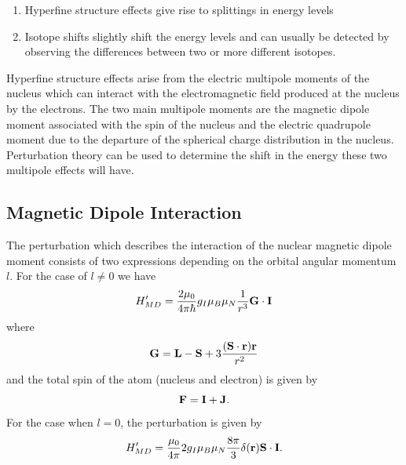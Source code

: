 \documentclass[a4paper]{IEEEtran}
\begin{document}
    \begin{enumerate}
        \item Hyperfine structure effects give rise to splittings in energy levels
        \item Isotope shifts slightly shift the energy levels and can usually be 
              detected by observing the differences between two or more 
              different isotopes.
    \end{enumerate} 

    Hyperfine structure effects arise from the electric multipole moments of the 
    nucleus which can interact with the electromagnetic field produced at the 
    nucleus by the electrons. The two main multipole moments are the magnetic 
    dipole moment associated with the spin of the nucleus and the electric quadrupole
    moment due to the departure of the spherical charge distribution in the nucleus.
    Perturbation theory can be used to determine the shift in the energy these
    two multipole effects will have.
       
    \subsection{Magnetic Dipole Interaction}
    The perturbation which describes the interaction of the nuclear magnetic dipole 
    moment consists of two expressions depending on the orbital angular momentum $l$.
    For the case of $l \neq 0$ we have
    \begin{equation}
        H'_{MD} = \frac{2\mu_0}{4 \pi \hbar} g_I \mu_B \mu_N \frac{1}{r^3}
                   {\bf G} \cdot {\bf I}
    \end{equation}
    where
    \begin{equation}
        {\bf G} = {\bf L} - {\bf S} + 3 \frac{({\bf S} \cdot {\bf r}) {\bf r}}{r^2}
    \end{equation}
    and the total spin of the atom (nucleus and electron) is given by
    \begin{equation}
        {\bf F} = {\bf I} + {\bf J}.
    \end{equation}
    For the case when $l = 0$, the perturbation is given by
    \begin{equation}
        H'_{MD}  =  \frac{\mu_0}{4\pi} 2g_I \mu_B \mu_N \frac{8 \pi}{3} 
               \delta({\bf r}) {\bf S} \cdot {\bf I}.
    \end{equation}
\end{document}
